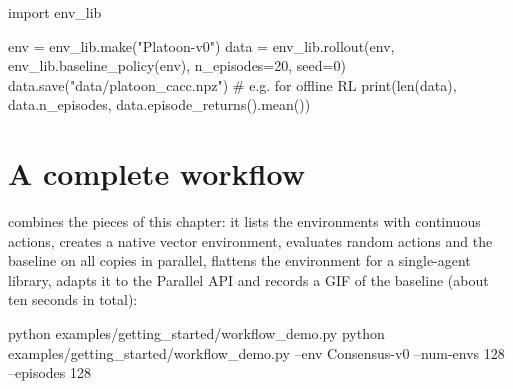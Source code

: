 \begin{pycode}
import env_lib

env = env_lib.make("Platoon-v0")
data = env_lib.rollout(env, env_lib.baseline_policy(env), n_episodes=20, seed=0)
data.save("data/platoon_cacc.npz")                   # e.g. for offline RL
print(len(data), data.n_episodes, data.episode_returns().mean())
\end{pycode}

\section{A complete workflow}\label{sec:workflow-example}

 combines the pieces of this chapter: it lists
the environments with continuous actions, creates a native vector environment,
evaluates random actions and the baseline on all copies in parallel, flattens
the environment for a single-agent library, adapts it to the Parallel API and
records a GIF of the baseline (about ten seconds in total):

\begin{shellcode}
python examples/getting_started/workflow_demo.py
python examples/getting_started/workflow_demo.py --env Consensus-v0 --num-envs 128 --episodes 128
\end{shellcode}

\endgroup

